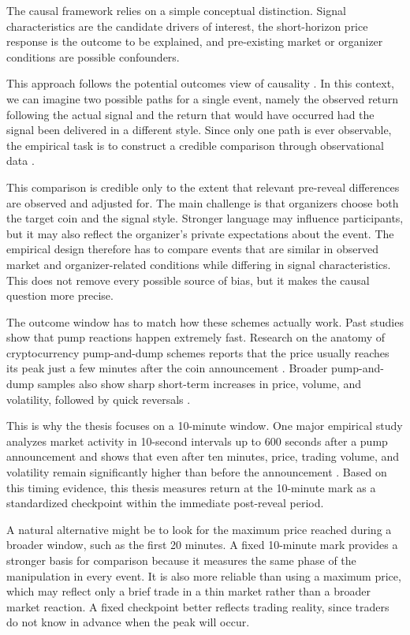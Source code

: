 The causal framework relies on a simple conceptual distinction. Signal characteristics are the candidate drivers of interest, the short-horizon price response is the outcome to be explained, and pre-existing market or organizer conditions are possible confounders.

This approach follows the potential outcomes view of causality \cite{rubin1974estimating}. In this context, we can imagine two possible paths for a single event, namely the observed return following the actual signal and the return that would have occurred had the signal been delivered in a different style. Since only one path is ever observable, the empirical task is to construct a credible comparison through observational data \cite{angrist2009mostly}.

This comparison is credible only to the extent that relevant pre-reveal differences are observed and adjusted for. The main challenge is that organizers choose both the target coin and the signal style. Stronger language may influence participants, but it may also reflect the organizer's private expectations about the event. The empirical design therefore has to compare events that are similar in observed market and organizer-related conditions while differing in signal characteristics. This does not remove every possible source of bias, but it makes the causal question more precise.

The outcome window has to match how these schemes actually work. Past studies show that pump reactions happen extremely fast. Research on the anatomy of cryptocurrency pump-and-dump schemes reports that the price usually reaches its peak just a few minutes after the coin announcement \cite{xu2019anatomy}. Broader pump-and-dump samples also show sharp short-term increases in price, volume, and volatility, followed by quick reversals \cite{li2021cryptocurrency}.

This is why the thesis focuses on a 10-minute window. One major empirical study analyzes market activity in 10-second intervals up to 600 seconds after a pump announcement and shows that even after ten minutes, price, trading volume, and volatility remain significantly higher than before the announcement \cite{li2021cryptocurrency}. Based on this timing evidence, this thesis measures return at the 10-minute mark as a standardized checkpoint within the immediate post-reveal period.

A natural alternative might be to look for the maximum price reached during a broader window, such as the first 20 minutes. A fixed 10-minute mark provides a stronger basis for comparison because it measures the same phase of the manipulation in every event. It is also more reliable than using a maximum price, which may reflect only a brief trade in a thin market rather than a broader market reaction. A fixed checkpoint better reflects trading reality, since traders do not know in advance when the peak will occur.


